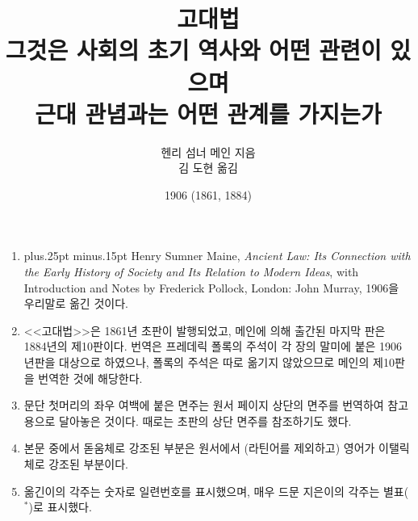 \documentclass[b5paper]{book}
\def\latinmarks{\hangulpunctuations=0
    \aftergroup\hangulpunctuations\aftergroup1\aftergroup\relax }
\def\latin#1{\ifnum\lastskip=0 \penalty50 \hskip0pt plus.25pt minus.15pt\fi
  \begingroup\latinmarks\footnotesize #1\endgroup}
\def\paren#1{\begingroup\small(#1)\endgroup}
\begin{document}
\title{고대법\\
\large 그것은 사회의 초기 역사와 어떤 관련이 있으며\\
근대 관념과는 어떤 관계를 가지는가}
\author{헨리 섬너 메인 지음\\
김 도현 옮김}
\date{1906 (1861, 1884)}

\frontmatter

\maketitle

\null\vfill
\thispagestyle{empty}
\begin{enumerate}
    \small
  \item \latin{\small
    Henry Sumner Maine, \textit{Ancient Law: Its Connection with
    the Early History of Society and Its Relation to Modern Ideas}, with
    Introduction and Notes by Frederick Pollock, London: John Murray,
    1906}을 우리말로 옮긴 것이다.
  \item <<고대법>>은 1861년 초판이 발행되었고,
    메인에 의해 출간된 마지막 판은 1884년의 제10판이다.
    번역은 프레데릭 폴록의 주석이
    각 장의 말미에 붙은 1906년판을 대상으로 하였으나,
    폴록의 주석은 따로 옮기지 않았으므로
    메인의 제10판을 번역한 것에 해당한다.
  \item 문단 첫머리의 좌우 여백에 붙은 면주는 원서 페이지 상단의 면주를
    번역하여
    참고용으로
    달아놓은 것이다.
    때로는 초판의 상단 면주를 참조하기도 했다.
  \item 본문 중에서 돋움체로 강조된 부분은
    원서에서 \paren{라틴어를 제외하고} 영어가
    이탤릭체로 강조된 부분이다.
  \item 옮긴이의 각주는 숫자로 일련번호를 표시했으며,
    매우 드문 지은이의 각주는 별표($^*$)로 표시했다.
\end{enumerate}

\begingroup
\linespread{1.25}
\tableofcontents
\endgroup






\mainmatter











\end{document}
